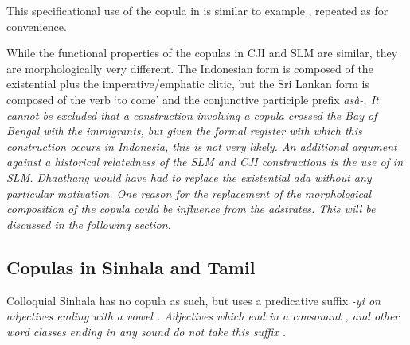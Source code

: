 \documentclass[a4paper,12pt]{article}
\begin{document}
This specificational use of the copula in  is similar to example , repeated as  for convenience.




While the functional properties of the copulas in CJI and SLM are similar, they are morphologically very different. The Indonesian form is composed of the existential plus the imperative/emphatic clitic, but the Sri Lankan form is composed of the verb `to come' and the conjunctive participle prefix \em asà-\em. It cannot be excluded that a construction involving a copula crossed the Bay of Bengal with the immigrants, but given the formal register with which this construction occurs in Indonesia, this is not very likely. An additional argument against a historical relatedness of the SLM and CJI constructions is the use of  in SLM. \em Dhaathang \em   would have had to replace the existential \em ada \em without any particular motivation. One reason for the replacement of the morphological composition of the copula could be influence from the adstrates. This will be discussed in the following section.

\subsection{Copulas in Sinhala and Tamil}
Colloquial Sinhala has no copula as such, but uses a predicative suffix \em -yi \em on adjectives ending with a vowel . Adjectives which end in a consonant  , and other word classes ending in any sound do not take this suffix .


\end{document}
